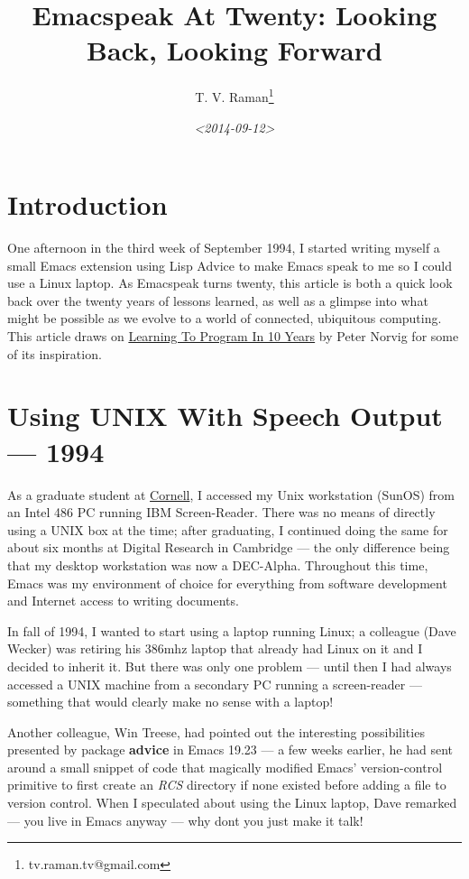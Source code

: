 \documentclass[11pt]{article}
\author{T. V. Raman\thanks{tv.raman.tv@gmail.com}}
\date{\textit{<2014-09-12>}}
\title{Emacspeak At Twenty: Looking Back, Looking Forward}
\begin{document}
\maketitle
\tableofcontents

\section{Introduction}
\label{sec-1}

One afternoon in the third week of September 1994, I started
writing myself a small Emacs extension using Lisp Advice to make
Emacs speak to me so I could use a Linux laptop. As Emacspeak
turns twenty, this article is both a quick look back over the
twenty years of lessons learned, as well as a glimpse into what
might be possible as we evolve to a world of connected,
ubiquitous computing. This article draws on \href{http://norvig.com/21-days.html}{Learning To Program
In 10 Years} by Peter Norvig for some of its inspiration.

\section{Using UNIX With Speech Output —  1994}
\label{sec-2}

As a graduate student at \href{http://www.cs.cornell.edu/info/people/raman/raman.html}{Cornell}, I accessed my Unix workstation
(SunOS) from an Intel 486 PC running IBM Screen-Reader. There
 was no means of directly using a UNIX box at the time; after
 graduating, I continued doing the same for about six months at
 Digital Research in Cambridge — the only difference being that
 my desktop workstation was now a DEC-Alpha. Throughout this
 time, Emacs was my environment of choice for everything from
 software development and Internet access to writing documents.


In fall of 1994, I wanted to start using a laptop running Linux;
a colleague (Dave Wecker) was retiring his 386mhz laptop that
already had Linux on it and I decided to inherit it. But there
was only one problem — until then I had always accessed a UNIX
machine from a secondary PC running a screen-reader — something
that would clearly make no sense with a laptop!

Another colleague, Win Treese, had pointed out the interesting
possibilities presented by package \textbf{advice} in Emacs 19.23 — a
few weeks earlier, he had sent around a small snippet of code
that magically modified Emacs' version-control primitive to first
create an \emph{RCS} directory if none existed before adding a file to
version control. When I speculated about using the Linux laptop,
Dave remarked — you live in Emacs anyway — why dont you just make
it talk!
\end{document}
